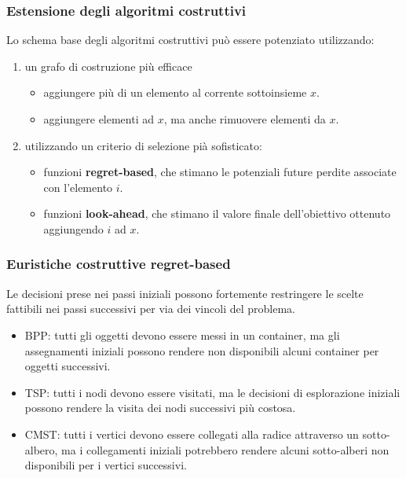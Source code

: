 \documentclass{article}
\begin{document}
    \subsubsection{Estensione degli algoritmi costruttivi}
    Lo schema base degli algoritmi costruttivi può essere potenziato utilizzando:
    \begin{enumerate}
        \item un grafo di costruzione più efficace
              \begin{itemize}
                  \item aggiungere più di un elemento al corrente sottoinsieme $x$.
                  \item aggiungere elementi ad $x$, ma anche rimuovere elementi da $x$.
              \end{itemize}
        \item utilizzando un criterio di selezione pià sofisticato:
              \begin{itemize}
                  \item funzioni \textbf{regret-based}, che stimano le potenziali future perdite associate con
                        l'elemento $i$.
                  \item funzioni \textbf{look-ahead}, che stimano il valore finale dell'obiettivo ottenuto
                        aggiungendo $i$ ad $x$.
              \end{itemize}
    \end{enumerate}

    \subsubsection{Euristiche costruttive regret-based}
    Le decisioni prese nei passi iniziali possono fortemente restringere le scelte fattibili nei passi
    successivi per via dei vincoli del problema.
    \begin{itemize}
        \item BPP: tutti gli oggetti devono essere messi in un container, ma gli assegnamenti
              iniziali possono rendere non disponibili alcuni container per oggetti successivi.
        \item TSP: tutti i nodi devono essere visitati, ma le decisioni di esplorazione
              iniziali possono rendere la visita dei nodi successivi più costosa.
        \item CMST: tutti i vertici devono essere collegati alla radice attraverso un sotto-albero,
              ma i collegamenti iniziali potrebbero rendere alcuni sotto-alberi non disponibili per i vertici
              successivi.
    \end{itemize}
\end{document}
